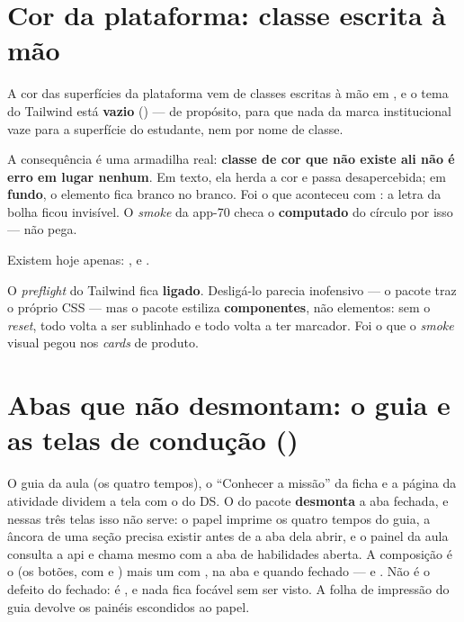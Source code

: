 \section{Cor da plataforma: classe escrita à mão}

\begin{atencao}
A cor das superfícies da plataforma vem de classes escritas à mão em
, e o tema do Tailwind está
\textbf{vazio} () --- de propósito, para que nada da
marca institucional vaze para a superfície do estudante, nem por nome de classe.

A consequência é uma armadilha real: \textbf{classe de cor que não existe ali não
é erro em lugar nenhum}. Em texto, ela herda a cor e passa desapercebida; em
\textbf{fundo}, o elemento fica branco no branco. Foi o que aconteceu com
: a letra da bolha ficou invisível. O \emph{smoke} da
app-70 checa o  \textbf{computado} do círculo por isso ---
 não pega.

Existem hoje apenas:
,
 e
.
\end{atencao}

\begin{nota}
O \emph{preflight} do Tailwind fica \textbf{ligado}. Desligá-lo parecia inofensivo
--- o pacote traz o próprio CSS --- mas o pacote estiliza \textbf{componentes},
não elementos: sem o \emph{reset}, todo  volta a ser sublinhado e todo
 volta a ter marcador. Foi o que o \emph{smoke} visual pegou nos
\emph{cards} de produto.
\end{nota}

\section{Abas que não desmontam: o guia e as telas de condução ()}
\label{ds:abas-montadas}

O guia da aula (os quatro tempos), o \enquote{Conhecer a missão} da ficha e a
página da atividade dividem a tela com o  do DS. O  do
pacote \textbf{desmonta} a aba fechada, e nessas três telas isso não serve: o
papel imprime os quatro tempos do guia, a âncora de uma seção precisa existir
antes de a aba dela abrir, e o painel da aula consulta a api e chama
 mesmo com a aba de habilidades aberta. A composição é o
 (os botões, com  e ) mais um
  com ,
 na aba e  quando fechado ---  e
. Não é o defeito do 
fechado:  é , e nada fica focável sem ser visto.
A folha de impressão do guia devolve os painéis escondidos ao papel.

